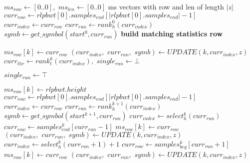 \documentclass[a4paper,12pt, oneside]{book}
\begin{document}
\begin{algorithm}
  \scriptsize
  \begin{algorithmic}[1]
    \State $ms_{row}\gets [0..0],\,\,ms_{len}\gets [0..0]$
    \Comment ms vectors with row and len of length $|z|$
    \State $curr_{row}\gets
    rlpbwt[0].samples_{end}[|rlpbwt[0].samples_{end}|-1]$
    \State $curr_{index}\gets curr_{row}$
    \State $curr_{run}\gets rank_h^0(curr_{index})$
    \State $symb\gets get\_symbol(start^0, curr_{run})$
    \Comment \textbf{build matching statistics row}
    \For {\textit{every} $k\in[0, |z|)$}

    \State $ms_{row}[k]\gets curr_{row}$
     \State $(curr_{index},\,\,curr_{run},\,\,symb)\gets UPDATE(k, curr_{index},
    z)$ 
    \EndIf
    \Else
    \State $curr_{thr}\gets rank_t^k(curr_{index}),\,\,single_{run}\gets \bot$

    \State $single_{run}\gets \top$
    \EndIf
    
    \State $ms_{row}[k]\gets rlpbwt.height$
    \State $curr_{row}\gets
    rlpbwt[0].samples_{end}[|rlpbwt[0].samples_{end}|-1]$
    \State $curr_{index}\gets curr_{row}$
    \State $curr_{run}\gets rank_h^{k+1}(curr_{index})$
    \State $symb\gets get\_symbol(start^{k+1}, curr_{run})$
    \EndIf
    \State $curr_{index}\gets select_h^{k}(curr_{run})$
    \State $curr_{row}\gets samples_{end}^k[curr_{run}-1]$
    \State $ms_{row}[k]\gets curr_{row}$
     \State $(curr_{index},\,\,curr_{run},\,\,symb)\gets UPDATE(k, curr_{index},
    z)$ 
    \EndIf
    \Else
    \State $curr_{index}\gets select_h^{k}(curr_{run}+1)+1$
    \State $curr_{row}\gets samples_{beg}^k[curr_{run}+1]$
    \State $ms_{row}[k]\gets curr_{row}$
     \State $(curr_{index},\,\,curr_{run},\,\,symb)\gets UPDATE(k, curr_{index},
    z)$ 
    \EndIf
    \EndIf
    

\end{algorithmic}
\end{algorithm}
\end{document}
